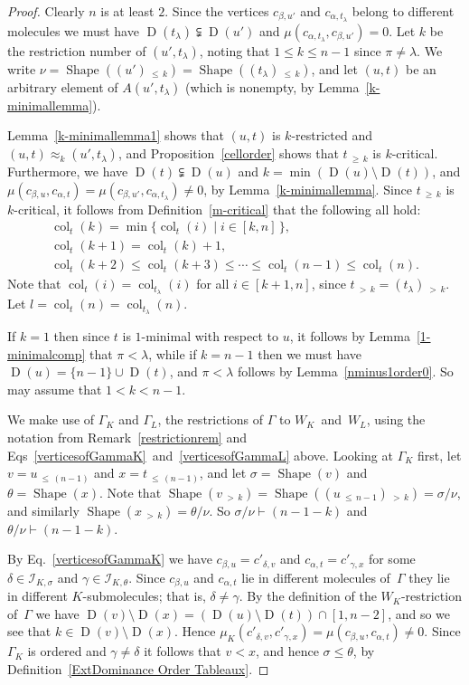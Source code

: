 \documentclass[ALCO,ThmDefs,Unicode,epreuves]{cedram}
\DeclareMathOperator{\col}{col}
\newcommand{\morethan}[2]{#1\,{_{>\,#2}}}
\newcommand{\Lessthan}[2]{#1\,{_{\leqslant\,#2}}}
\newcommand{\Morethan}[2]{#1\,{_{\geqslant\,#2}}}
\DeclareMathOperator{\shape}{Shape}
\DeclareMathOperator{\D}{D}
\begin{document}
\begin{proof}
Clearly $n$ is at least $2$. Since the vertices $c_{\beta,u'}$ and $c_{\alpha,t_\lambda}$
belong to different molecules we must have $\D(t_\lambda)\subsetneqq\D(u')$
and $\mu(c_{\alpha,t_\lambda},c_{\beta,u'})=0$. Let $k$ be the restriction number of
$(u',t_\lambda)$, noting that $1\leqslant k\leqslant n-1$ since $\pi\ne\lambda$.
We write $\nu=\shape(\Lessthan{(u')}k) = \shape(\Lessthan{(t_\lambda)}k)$, and
let $(u,t)$ be an arbitrary element of $A(u',t_\lambda)$ (which is nonempty,
by Lemma~\ref{k-minimallemma}).

Lemma~\ref{k-minimallemma1} shows that $(u,t)$ is $k$-restricted
and $(u,t)\approx_k (u',t_\lambda)$, and Proposition~\ref{cellorder}
shows that $\Morethan{t}{k}$ is $k$-critical.
Furthermore, we have $\D(t)\subsetneqq\D(u)$ and $k=\min(\D(u)\setminus\D(t))$, and
$\mu(c_{\beta,u},c_{\alpha,t})=\mu(c_{\beta,u'},c_{\alpha,t_\lambda})\neq 0$,
by Lemma~\ref{k-minimallemma}.
Since $\Morethan tk$ is~$k$-critical, it follows from Definition~\ref{m-critical}
that the following all hold:
\begin{gather}
\col_t(k)=\min\{\col_t(i)\mid i\in[k,n]\,\},\label{kfirst}\\
\col_t(k+1)=\col_t(k)+1,\label{colk+1}\\
\col_t(k+2)\leqslant\col_t(k+3)\leqslant\cdots\leqslant\col_t(n-1)\leqslant\col_t(n).
\label{incseq}
\end{gather}
Note that $\col_t(i)=\col_{t_\lambda}(i)$ for all $i\in[k+1,n]$, since
$\morethan tk=\morethan{(t_\lambda)}k$. Let $l=\col_t(n)=\col_{t_\lambda}(n)$.

If $k=1$ then since $t$ is $1$-minimal with respect to $u$, it follows
by Lemma~\ref{1-minimalcomp} that $\pi<\lambda$, while if $k=n-1$ then we must have
$\D(u)=\{n-1\}\cup\D(t)$, and $\pi<\lambda$ follows by Lemma~\ref{nminus1order0}.
So may assume that $1<k<n-1$.

We make use of $\Gamma_K$ and $\Gamma_L$, the restrictions of
$\Gamma$ to $W_K$~and~$W_L$, using the notation from Remark~\ref{restrictionrem}
and Eqs~\eqref{verticesofGammaK}~and~\eqref{verticesofGammaL} above.
Looking at $\Gamma_K$ first, let $v=\Lessthan u{(n-1)}$ and
$x=\Lessthan t{(n-1)}$, and let $\sigma=\shape(v)$ and $\theta=\shape(x)$.
Note that $\shape(\morethan vk)=\shape(\morethan{(\Lessthan u{n-1})}k)=\sigma/\nu$,
and similarly $\shape(\morethan xk)=\theta/\nu$.
So $\sigma/\nu\vdash (n-1-k)$ and $\theta/\nu\vdash (n-1-k)$.

By Eq.~\eqref{verticesofGammaK} we have $c_{\beta,u}=c'_{\delta,v}$ and
$c_{\alpha,t}=c'_{\gamma,x}$ for some $\delta\in\mathcal{I}_{K,\sigma}$ and
$\gamma\in\mathcal{I}_{K,\theta}$. Since $c_{\beta,u}$ and $c_{\alpha,t}$
lie in different molecules of~$\Gamma$ they lie in different
$K$-submolecules; that is, $\delta\ne\gamma$.
By the definition of the $W_K$-restriction of~$\Gamma$ we
have $\D(v)\setminus\D(x)=(\D(u)\setminus\D(t))\cap[1,n-2]$, and
so we see that $k\in\D(v)\setminus\D(x)$. Hence
$\mu_K(c'_{\delta,v},c'_{\gamma,x})=\mu(c_{\beta,u},c_{\alpha,t})\neq 0$.
Since $\Gamma_K$ is ordered and $\gamma\neq\delta$
it follows that $v<x$, and hence $\sigma\leqslant\theta$,
by Definition~\ref{ExtDominance Order Tableaux}.


\end{proof}
\end{document}

